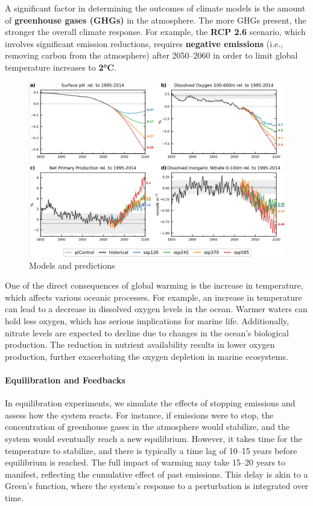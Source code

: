 A significant factor in determining the outcomes of climate models is the amount of \textbf{greenhouse gases (GHGs)} in the atmosphere. The more GHGs present, the stronger the overall climate response. For example, the \textbf{RCP 2.6} scenario, which involves significant emission reductions, requires \textbf{negative emissions} (i.e., removing carbon from the atmosphere) after 2050–2060 in order to limit global temperature increases to \textbf{2°C}.
\begin{figure}[htpb]
	\centering
	\includegraphics[width=0.5\linewidth]{uploads/predictions.png}
	\caption{Models and predictions}

\end{figure}

One of the direct consequences of global warming is the increase in temperature, which affects various oceanic processes. For example, an increase in temperature can lead to a decrease in dissolved oxygen levels in the ocean. Warmer waters can hold less oxygen, which has serious implications for marine life. Additionally, nitrate levels are expected to decline due to changes in the ocean's biological production. The reduction in nutrient availability results in lower oxygen production, further exacerbating the oxygen depletion in marine ecosystems.

\paragraph{Equilibration and Feedbacks}

In equilibration experiments, we simulate the effects of stopping emissions and assess how the system reacts. For instance, if emissions were to stop, the concentration of greenhouse gases in the atmosphere would stabilize, and the system would eventually reach a new equilibrium. However, it takes time for the temperature to stabilize, and there is typically a time lag of 10–15 years before equilibrium is reached. The full impact of warming may take 15–20 years to manifest, reflecting the cumulative effect of past emissions. This delay is akin to a Green's function, where the system's response to a perturbation is integrated over time.

